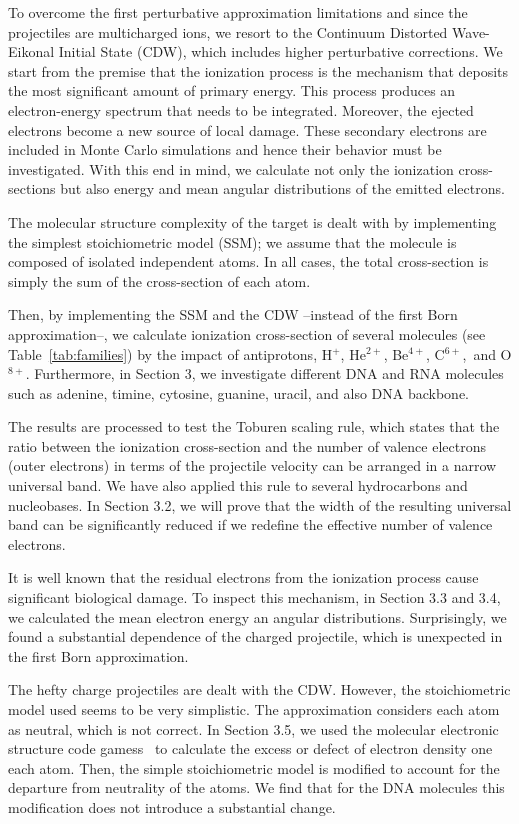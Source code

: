 \documentclass[preprint,12pt]{article}
\begin{document}
To overcome the first perturbative approximation limitations and 
since the projectiles are multicharged ions, we resort to the 
Continuum Distorted Wave-Eikonal Initial State (CDW), which includes 
higher perturbative corrections. We start from the premise that the 
ionization process is the mechanism that deposits the most significant 
amount of primary energy. This process produces an electron-energy 
spectrum that needs to be integrated. Moreover, the ejected electrons 
become a new source of local damage. These secondary electrons are 
included in Monte Carlo simulations and hence their behavior must be
investigated. With this end in mind, we calculate not only the 
ionization cross-sections but also energy and mean angular distributions 
of the emitted electrons.

The molecular structure complexity of the target is dealt with by 
implementing the simplest stoichiometric model (SSM); we assume that 
the molecule is composed of isolated independent atoms. In all cases, 
the total cross-section is simply the sum of the cross-section of each 
atom.

Then, by implementing the SSM and the CDW --instead of the first Born 
approximation--, we calculate ionization cross-section of several 
molecules (see Table~\ref{tab:families}) by the impact of antiprotons,
H$^{+}$, He$^{2+}$, Be$^{4+}$, C$^{6+}$,\ and O$^{8+}$. Furthermore, 
in Section 3, we investigate different DNA and RNA molecules
such as adenine, timine, cytosine, guanine, uracil, and also DNA 
backbone.

The results are processed to test the Toburen scaling rule, which 
states that the ratio between the ionization cross-section and the 
number of valence electrons (outer electrons) in terms of the 
projectile velocity can be arranged in a narrow universal band. 
We have also applied this rule to several hydrocarbons and nucleobases. 
In Section 3.2, we will prove that the width of the resulting universal 
band can be significantly reduced if we redefine the effective number 
of valence electrons.

It is well known that the residual electrons from the ionization 
process cause significant biological damage. To inspect this mechanism, 
in Section 3.3 and 3.4, we calculated the mean electron energy an 
angular distributions. Surprisingly, we found a substantial dependence 
of the charged projectile, which is unexpected in the first Born 
approximation. 

The hefty charge projectiles are dealt with the CDW. However, the 
stoichiometric model used seems to be very simplistic. The approximation
considers each atom as neutral, which is not correct. In Section 3.5, 
we used the molecular electronic structure code 
{\sc gamess}~\cite{gamess} to calculate the excess or defect of 
electron density one each atom. Then, the simple stoichiometric model is
modified to account for the departure from neutrality of the atoms. 
We find that for the DNA molecules this modification does not introduce 
a substantial change.
\end{document}

